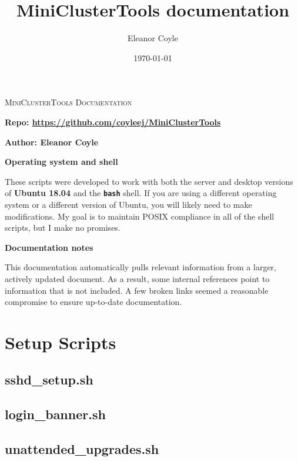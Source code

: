 \documentclass[10pt,letterpaper]{report}
\title{MiniClusterTools documentation}
\author{Eleanor Coyle}
\date{\today}
\begin{document}
\begin{titlepage}
	\centering
	\vfill
	{\huge\scshape MiniClusterTools Documentation\par}

	\vspace{3cm}
	\textbf{Repo: \href{https://github.com/coyleej/MiniClusterTools}{https://github.com/coyleej/MiniClusterTools}}

	\vspace{0.5cm}
	\textbf{Author: Eleanor Coyle}

	\vfill
	\textbf{Operating system and shell} \par
	These scripts were developed to work with both the server and desktop versions of \textbf{Ubuntu 18.04} and the \textbf{\texttt{bash}} shell. If you are using a different operating system or a different version of Ubuntu, you will likely need to make modifications. My goal is to maintain POSIX compliance in all of the shell scripts, but I make no promises.

	\vspace{1cm}
	\textbf{Documentation notes} \par
	This documentation automatically pulls relevant information from a larger, actively updated document. 
	As a result, some internal references point to information that is not included. 
	A few broken links seemed a reasonable compromise to ensure up-to-date documentation.

\end{titlepage}

\tableofcontents

\chapter{Setup Scripts}				\label{ch:setup}

\section{sshd\_setup.sh}			\label{sec:openssh}
	

\section{login\_banner.sh}			\label{sec:login}
	

\section{unattended\_upgrades.sh}	\label{sec:mandatoryautoupgrades}
	
\end{document}
